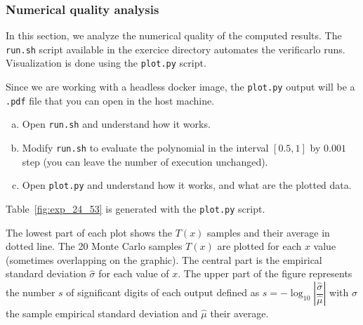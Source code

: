 
\subsubsection{Numerical quality analysis}

In this section, we analyze the numerical quality of the computed results.  The
\texttt{run.sh} script available in the exercice directory automates the
verificarlo runs.  Visualization is done using the \texttt{plot.py} script.

Since we are working with a headless docker image, the \texttt{plot.py} output
will be a \texttt{.pdf} file that you can open in the host machine.

\begin{question}
  \begin{enumerate}[(a)]
    \item Open {\tt run.sh} and understand how it works.
    \item Modify {\tt run.sh} to evaluate the polynomial in the interval $[0.5,1]$ by $0.001$ step (you can leave the number of execution unchanged).
    \item Open {\tt plot.py} and understand how it works, and what are the plotted data.
  \end{enumerate}
\end{question}

Table~\ref{fig:exp_24_53} is generated with the \texttt{plot.py} script.

The lowest part of each plot shows the $T(x)$ samples and their average in dotted line. The 20 Monte Carlo samples $T(x)$ are plotted for each $x$ value (sometimes overlapping on the graphic).
The central part is the empirical standard deviation $\hat\sigma$ for each value of $x$.
The upper part of the figure represents the number $s$ of significant digits of each output defined as $s=-\log_{10}\left|\dfrac{\hat\sigma}{\hat\mu}\right|$ with $\hat\sigma$ the sample empirical standard deviation and $\hat\mu$ their average.

